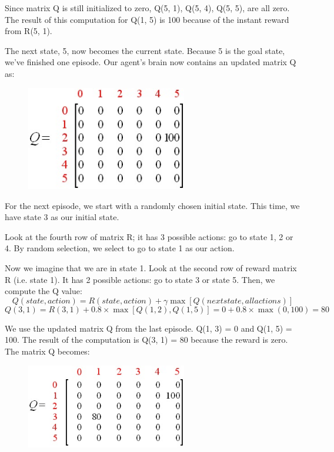 \documentclass[a4paper, 11pt]{article}
\begin{document}
Since matrix Q is still initialized to zero, Q(5, 1), Q(5, 4), Q(5, 5), are all zero.  The result of this computation for Q(1, 5) is 100 because of the instant reward from R(5, 1).

The next state, 5, now becomes the current state.  Because 5 is the goal state, we've finished one episode.  Our agent's brain now contains an updated matrix Q as:

\begin{figure}[ht]
\centering
\includegraphics[width=7cm]{Pic/q_matrix2}
\end{figure}

For the next episode, we start with a randomly chosen initial state.  This time, we have state 3 as our initial state.

Look at the fourth row of matrix R; it has 3 possible actions: go to state 1, 2 or 4.  By random selection, we select to go to state 1 as our action.

Now we imagine that we are in state 1.  Look at the second row of reward matrix R (i.e. state 1).  It has 2 possible actions: go to state 3 or state 5.  Then, we compute the Q value:
$$Q(state, action) = R(state, action) + \gamma\max[Q(next state, all actions)]$$
$$Q(3, 1) = R(3, 1) + 0.8\times\max[Q(1, 2), Q(1, 5)] = 0 + 0.8\times\max(0, 100) = 80$$

We use the updated matrix Q from the last episode.  Q(1, 3) = 0 and Q(1, 5) = 100.  The result of the computation is Q(3, 1) = 80 because the reward is zero.  The matrix Q becomes:
\begin{figure}[ht]
\centering
\centering\includegraphics[width=7cm]{Pic/q_matrix3}
\end{figure}
\end{document}
